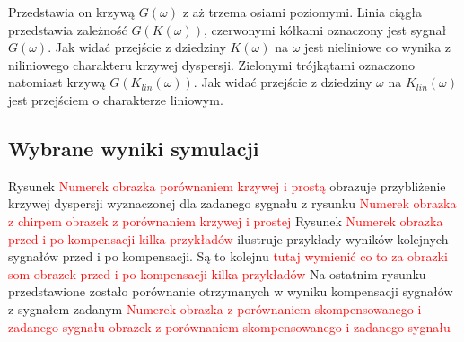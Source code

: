 Przedstawia on krzywą $G(\omega)$ z aż trzema osiami poziomymi. Linia ciągła przedstawia zależność $G(K(\omega))$, czerwonymi kółkami oznaczony jest sygnał $G(\omega)$. Jak widać przejście z dziedziny $K(\omega)$ na $\omega$ jest nieliniowe co wynika z niliniowego charakteru krzywej dyspersji. Zielonymi trójkątami oznaczono natomiast krzywą $G(K_{lin}(\omega))$. Jak widać przejście z dziedziny $\omega$ na $K_{lin}(\omega)$ jest przejściem o charakterze liniowym. 
\subsection{Wybrane wyniki symulacji}
Rysunek \textcolor{red}{Numerek obrazka porównaniem krzywej i prostą} obrazuje przybliżenie krzywej dyspersji wyznaczonej dla zadanego sygnału z rysunku \textcolor{red}{Numerek obrazka z chirpem} 
\textcolor{red}{obrazek z porównaniem krzywej i prostej}
Rysunek \textcolor{red}{Numerek obrazka przed i po kompensacji kilka przykładów} ilustruje przykłady wyników kolejnych sygnałów przed i po kompensacji. Są to kolejnu \textcolor{red}{tutaj wymienić co to za obrazki som}
\textcolor{red}{obrazek przed i po kompensacji kilka przykładów}
Na ostatnim rysunku przedstawione zostało porównanie otrzymanych w wyniku kompensacji sygnałów z sygnałem zadanym \textcolor{red}{Numerek obrazka z porównaniem skompensowanego i zadanego sygnału}
\textcolor{red}{obrazek z porównaniem skompensowanego i zadanego sygnału}
